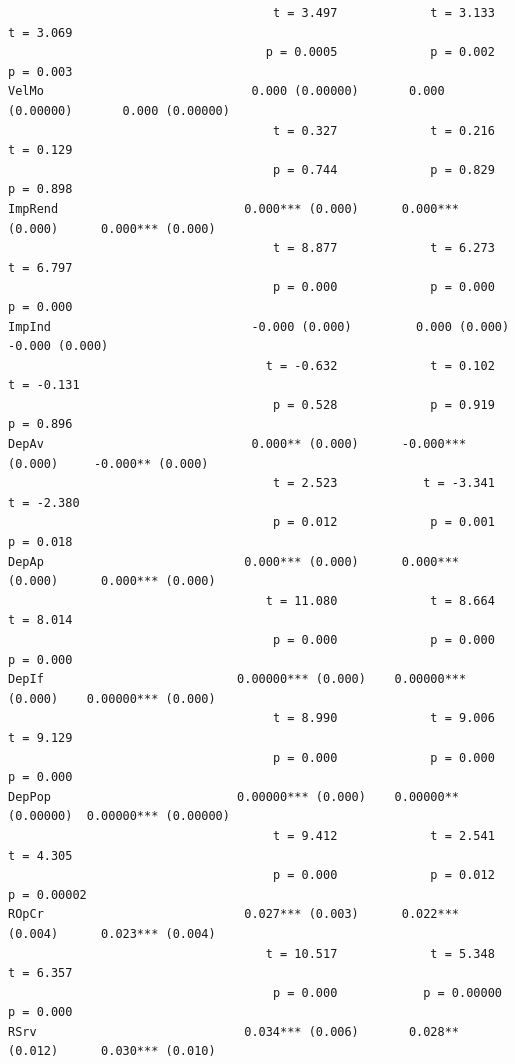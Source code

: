 \documentclass[12pt,12pt,openright,oneside,a4paper,chapter=TITLE,section=TITLE,subsection=TITLE,subsubsection=TITLE,english,french,spanish,portugues,sumario=tradicional]{abntex2}
\begin{document}
\begin{verbatim}
                                     t = 3.497             t = 3.133             t = 3.069      
                                    p = 0.0005             p = 0.002             p = 0.003      
VelMo                             0.000 (0.00000)       0.000 (0.00000)       0.000 (0.00000)   
                                     t = 0.327             t = 0.216             t = 0.129      
                                     p = 0.744             p = 0.829             p = 0.898      
ImpRend                          0.000*** (0.000)      0.000*** (0.000)      0.000*** (0.000)   
                                     t = 8.877             t = 6.273             t = 6.797      
                                     p = 0.000             p = 0.000             p = 0.000      
ImpInd                            -0.000 (0.000)         0.000 (0.000)        -0.000 (0.000)    
                                    t = -0.632             t = 0.102            t = -0.131      
                                     p = 0.528             p = 0.919             p = 0.896      
DepAv                             0.000** (0.000)      -0.000*** (0.000)     -0.000** (0.000)   
                                     t = 2.523            t = -3.341            t = -2.380      
                                     p = 0.012             p = 0.001             p = 0.018      
DepAp                            0.000*** (0.000)      0.000*** (0.000)      0.000*** (0.000)   
                                    t = 11.080             t = 8.664             t = 8.014      
                                     p = 0.000             p = 0.000             p = 0.000      
DepIf                           0.00000*** (0.000)    0.00000*** (0.000)    0.00000*** (0.000)  
                                     t = 8.990             t = 9.006             t = 9.129      
                                     p = 0.000             p = 0.000             p = 0.000      
DepPop                          0.00000*** (0.000)    0.00000** (0.00000)  0.00000*** (0.00000) 
                                     t = 9.412             t = 2.541             t = 4.305      
                                     p = 0.000             p = 0.012            p = 0.00002     
ROpCr                            0.027*** (0.003)      0.022*** (0.004)      0.023*** (0.004)   
                                    t = 10.517             t = 5.348             t = 6.357      
                                     p = 0.000            p = 0.00000            p = 0.000      
RSrv                             0.034*** (0.006)       0.028** (0.012)      0.030*** (0.010)   

\end{verbatim}
\end{document}
